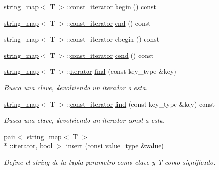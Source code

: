 \begin{DoxyCompactItemize}
\item 
\hyperlink{classstring__map}{string\+\_\+map}$<$ T $>$\+::\hyperlink{classstring__map_1_1const__iterator}{const\+\_\+iterator} \hyperlink{classstring__map_a978694b6ac9df86a1688d1e4a0642e52}{begin} () const 
\item 
\hyperlink{classstring__map}{string\+\_\+map}$<$ T $>$\+::\hyperlink{classstring__map_1_1const__iterator}{const\+\_\+iterator} \hyperlink{classstring__map_a66b1f31d0b10c79f549d51e687ec5446}{end} () const 
\item 
\hyperlink{classstring__map}{string\+\_\+map}$<$ T $>$\+::\hyperlink{classstring__map_1_1const__iterator}{const\+\_\+iterator} \hyperlink{classstring__map_a3bfb3c2ea8483f2fa6e5828f006bb4e8}{cbegin} () const 
\item 
\hyperlink{classstring__map}{string\+\_\+map}$<$ T $>$\+::\hyperlink{classstring__map_1_1const__iterator}{const\+\_\+iterator} \hyperlink{classstring__map_a189727335bb6c45b5a88eab480c82446}{cend} () const 
\item 
\hyperlink{classstring__map}{string\+\_\+map}$<$ T $>$\+::\hyperlink{classstring__map_1_1iterator}{iterator} \hyperlink{classstring__map_abbe345fcf0ece43b416ea0e4699d95ed}{find} (const key\+\_\+type \&key)
\begin{DoxyCompactList}\small\item\em Busca una clave, devolviendo un iterador a esta. \end{DoxyCompactList}\item 
\hyperlink{classstring__map}{string\+\_\+map}$<$ T $>$\+::\hyperlink{classstring__map_1_1const__iterator}{const\+\_\+iterator} \hyperlink{classstring__map_a4705d569ebabcfe6ecbe3a4c66958ce5}{find} (const key\+\_\+type \&key) const 
\begin{DoxyCompactList}\small\item\em Busca una clave, devolviendo un iterador const a esta. \end{DoxyCompactList}\item 
pair$<$ \hyperlink{classstring__map}{string\+\_\+map}$<$ T $>$\\*
\+::\hyperlink{classstring__map_1_1iterator}{iterator}, bool $>$ \hyperlink{classstring__map_a2fff1076bccd20802f03f72a92275b33}{insert} (const value\+\_\+type \&value)
\begin{DoxyCompactList}\small\item\em Define el string de la tupla parametro como clave y T como significado. \end{DoxyCompactList}\item 

\end{DoxyCompactItemize}
